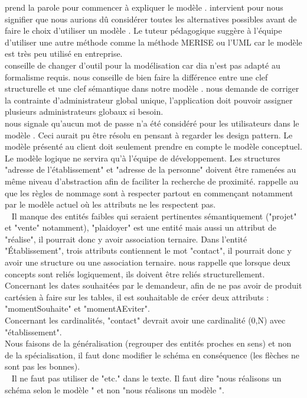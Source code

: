 \documentclass [a4paper] {article}
\begin{document}
\Julie{} prend la parole pour commencer à expliquer le modèle \EA{}.
\nomTuteurPedago{} intervient pour nous signifier que nous aurions dû considérer toutes les alternatives possibles avant de  faire le choix d'utiliser un modèle \EA{}. Le tuteur pédagogique suggère à l'équipe d'utiliser une autre méthode comme la méthode MERISE ou l'UML car le modèle \EA{} est très peu utilisé en entreprise. \\
\nomTuteurPedago{} conseille de changer d'outil pour la modélisation car dia n'est pas adapté au formalisme requis. \nomTuteurPedago{} nous conseille de bien faire la différence entre une clef structurelle et une clef sémantique dans notre modèle \EA{}.
\nomTuteurPedago{} nous demande de corriger la contrainte d'administrateur global unique, l'application doit pouvoir assigner plusieurs administrateurs globaux si besoin. \\
\nomTuteurPedago{} nous signale qu'aucun mot de passe n'a été considéré pour les utilisateurs dans le modèle \EA{}. Ceci aurait pu être résolu en pensant à regarder les design pattern. 
Le modèle \EA{} présenté au client doit seulement prendre en compte le modèle conceptuel. Le modèle logique ne servira qu'à l'équipe de développement. 
Les structures "adresse de l'établissement" et "adresse de la personne" doivent être ramenées au même niveau d'abstraction afin de faciliter la recherche de proximité.
\nomTuteurPedago{} rappelle au \RGC{} que les règles de nommage sont à respecter partout en commençant notamment par le modèle \EA{} actuel où les attributs ne les respectent pas.
\\ ~
Il manque des entités faibles qui seraient pertinentes sémantiquement ("projet" et "vente" notamment), "plaidoyer" est une entité mais aussi un attribut de "réalise", il pourrait donc y avoir association ternaire. Dans l'entité "Établissement", trois attributs contiennent le mot "contact", il pourrait donc y avoir une structure ou une association ternaire. \nomTuteurPedago{} nous rappelle que lorsque deux concepts sont reliés logiquement, ils doivent être reliés structurellement. Concernant les dates souhaitées par le demandeur, afin de ne pas avoir de produit cartésien à faire sur les tables, il est souhaitable de créer deux attributs : "momentSouhaite" et "momentAEviter".
\\
Concernant les cardinalités, "contact" devrait avoir une cardinalité (0,N) avec "établissement".
\\
Nous faisons de la généralisation (regrouper des entités proches en sens) et non de la spécialisation, il faut donc modifier le schéma en conséquence (les flèches ne sont pas les bonnes).
\\ ~
Il ne faut pas utiliser de "etc." dans le texte. Il faut dire "nous réalisons un schéma selon le modèle \EACourt" et non "nous réalisons un modèle \EACourt".
\end{document}

